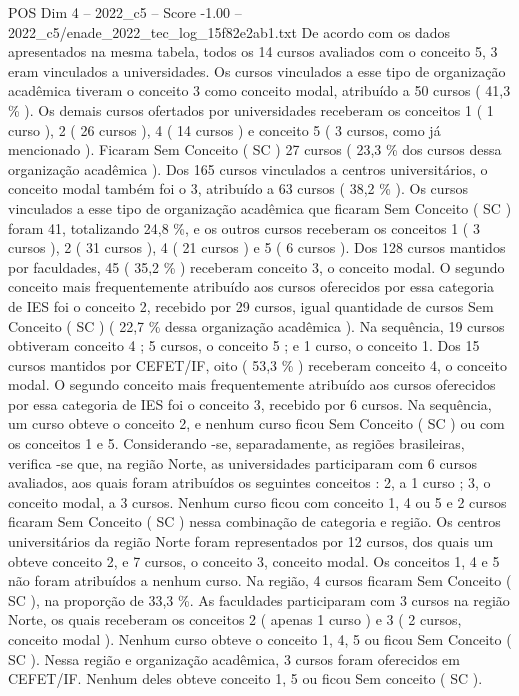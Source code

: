 \begin{textsample}{POS Dim 4 – 2022\_c5 – Score -1.00 – 2022\_c5/enade\_2022\_tec\_log\_15f82e2ab1.txt}
De acordo com os dados apresentados na mesma tabela, todos os 14 cursos avaliados com o conceito 5, 3 eram vinculados a universidades.
Os cursos vinculados a esse tipo de organização acadêmica tiveram o conceito 3 como conceito modal, atribuído a 50 cursos ( 41,3 \% ).
Os demais cursos ofertados por universidades receberam os conceitos 1 ( 1 curso ), 2 ( 26 cursos ), 4 ( 14 cursos ) e conceito 5 ( 3 cursos, como já mencionado ).
Ficaram Sem Conceito ( SC ) 27 cursos ( 23,3 \% dos cursos dessa organização acadêmica ).
Dos 165 cursos vinculados a centros universitários, o conceito modal também foi o 3, atribuído a 63 cursos ( 38,2 \% ).
Os cursos vinculados a esse tipo de organização acadêmica que ficaram Sem Conceito ( SC ) foram 41, totalizando 24,8 \%, e os outros cursos receberam os conceitos 1 ( 3 cursos ), 2 ( 31 cursos ), 4 ( 21 cursos ) e 5 ( 6 cursos ).
Dos 128 cursos mantidos por faculdades, 45 ( 35,2 \% ) receberam conceito 3, o conceito modal.
O segundo conceito mais frequentemente atribuído aos cursos oferecidos por essa categoria de IES foi o conceito 2, recebido por 29 cursos, igual quantidade de cursos Sem Conceito ( SC ) ( 22,7 \% dessa organização acadêmica ).
Na sequência, 19 cursos obtiveram conceito 4 ; 5 cursos, o conceito 5 ; e 1 curso, o conceito 1.
Dos 15 cursos mantidos por CEFET/IF, oito ( 53,3 \% ) receberam conceito 4, o conceito modal.
O segundo conceito mais frequentemente atribuído aos cursos oferecidos por essa categoria de IES foi o conceito 3, recebido por 6 cursos.
Na sequência, um curso obteve o conceito 2, e nenhum curso ficou Sem Conceito ( SC ) ou com os conceitos 1 e 5.
Considerando -se, separadamente, as regiões brasileiras, verifica -se que, na região Norte, as universidades participaram com 6 cursos avaliados, aos quais foram atribuídos os seguintes conceitos : 2, a 1 curso ; 3, o conceito modal, a 3 cursos.
Nenhum curso ficou com conceito 1, 4 ou 5 e 2 cursos ficaram Sem Conceito ( SC ) nessa combinação de categoria e região.
Os centros universitários da região Norte foram representados por 12 cursos, dos quais um obteve conceito 2, e 7 cursos, o conceito 3, conceito modal.
Os conceitos 1, 4 e 5 não foram atribuídos a nenhum curso.
Na região, 4 cursos ficaram Sem Conceito ( SC ), na proporção de 33,3 \%.
As faculdades participaram com 3 cursos na região Norte, os quais receberam os conceitos 2 ( apenas 1 curso ) e 3 ( 2 cursos, conceito modal ).
Nenhum curso obteve o conceito 1, 4, 5 ou ficou Sem Conceito ( SC ).
Nessa região e organização acadêmica, 3 cursos foram oferecidos em CEFET/IF.
Nenhum deles obteve conceito 1, 5 ou ficou Sem conceito ( SC ).

\end{textsample}
